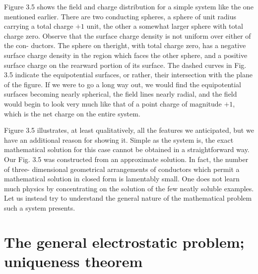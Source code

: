 Figure 3.5 shows the field and charge distribution for a simple
system like the one mentioned earlier. There are two conducting
spheres, a sphere of unit radius carrying a total charge $+1$ unit, the
other a somewhat larger sphere with total charge zero. Observe that
the surface charge density is not uniform over either of the con-
ductors. The sphere on theright, with total charge zero, has a negative
surface charge density in the region which faces the other sphere,
and a positive surface charge on the rearward portion of its surface.
The dashed curves in Fig. 3.5 indicate the equipotential surfaces, or
rather, their intersection with the plane of the figure. If we were to
go a long way out, we would find the equipotential surfaces becoming
nearly spherical, the field lines nearly radial, and the field would
begin to look very much like that of a point charge of magnitude $+1$,
which is the net charge on the entire system.

Figure 3.5 illustrates, at least qualitatively, all the features we
anticipated, but we have an additional reason for showing it. Simple
as the system is, the exact mathematical solution for this case cannot
be obtained in a straightforward way. Our Fig. 3.5 was constructed
from an approximate solution. In fact, the number of three-
dimensional geometrical arrangements of conductors which permit
a mathematical solution in closed form is lamentably small. One
does not learn much physics by concentrating on the solution of the
few neatly soluble examples. Let us instead try to understand the
general nature of the mathematical problem such a system presents.


\section{The general electrostatic problem; uniqueness theorem}

